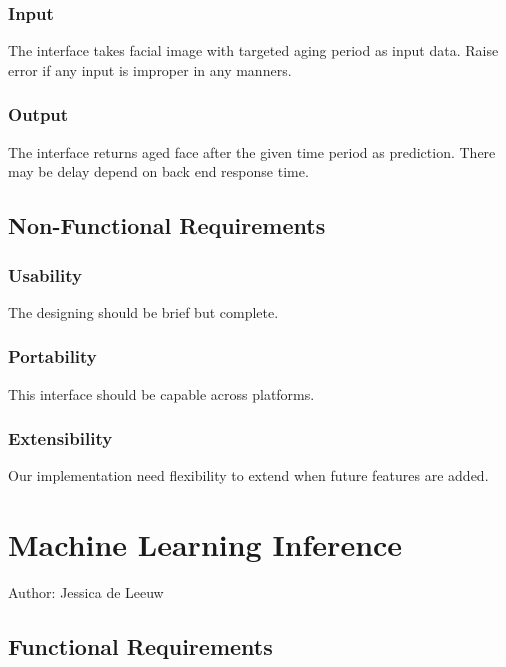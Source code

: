 \documentclass[12pt]{article}
\begin{document}
\subsubsection{Input}\label{input}
The interface takes facial image with targeted aging period as input data. Raise error if any input is improper in any manners.
\subsubsection{Output}
The interface returns aged face after the given time period as prediction. There may be delay depend on back end response time.

\subsection{Non-Functional Requirements}

\subsubsection {Usability}

The designing should be brief but complete.

\subsubsection {Portability}

This interface should be capable across platforms.

\subsubsection {Extensibility}
 
Our implementation need flexibility to extend when future features are added.


\section{Machine Learning Inference}
Author: Jessica de Leeuw\\

\subsection{Functional Requirements}
\end{document}
